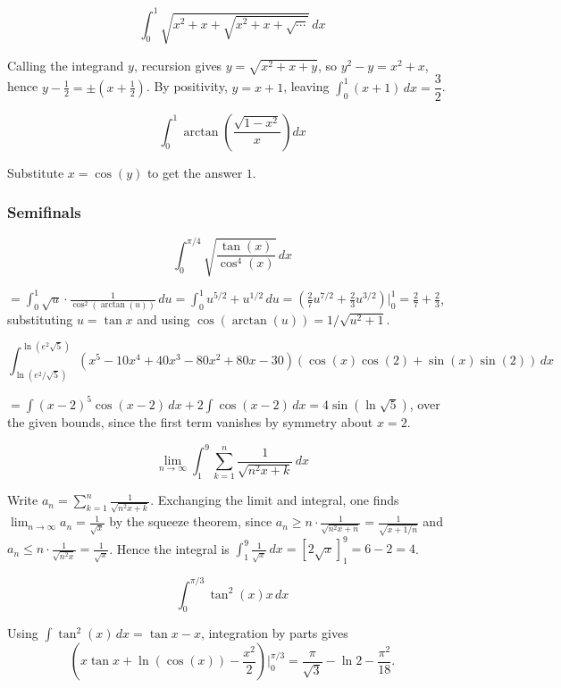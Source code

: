\begin{questions}
\question \[ \int_0^1 \sqrt{x^2+x+\sqrt{x^2+x+\sqrt{\cdots}}}\, dx \]
\begin{solution}
Calling the integrand $y$, recursion gives $y=\sqrt{x^2+x+y}$, so $y^2-y=x^2+x$, hence $y-\tfrac12=\pm(x+\tfrac12)$. By positivity, $y=x+1$, leaving $\int_0^1 (x+1)\, dx = \dfrac{3}{2}$.
\end{solution}

\question \[ \int_0^1 \arctan\left(\frac{\sqrt{1-x^2}}{x}\right) dx \]
\begin{solution}
Substitute $x=\cos(y)$ to get the answer $1$.
\end{solution}

\end{questions}

\subsubsection*{Semifinals}
\begin{questions}

\question \[ \int_0^{\pi/4} \sqrt{\frac{\tan(x)}{\cos^4(x)}}\, dx \]
\begin{solution}
$= \displaystyle\int_0^1 \sqrt{u}\cdot\frac{1}{\cos^2(\arctan(u))}\, du = \int_0^1 u^{5/2}+u^{1/2}\, du = \left(\frac{2}{7}u^{7/2}+\frac{2}{3}u^{3/2}\right)\Big|_0^1 = \frac{2}{7}+\frac{2}{3}$,
substituting $u=\tan x$ and using $\cos(\arctan(u)) = 1/\sqrt{u^2+1}$.
\end{solution}

\question \[ \int_{\ln(e^2/\sqrt5)}^{\ln(e^2\sqrt5)} \left(x^5-10x^4+40x^3-80x^2+80x-30\right)\left(\cos(x)\cos(2)+\sin(x)\sin(2)\right)\, dx \]
\begin{solution}
$= \displaystyle\int (x-2)^5\cos(x-2)\, dx + 2\int \cos(x-2)\, dx = 4\sin(\ln\sqrt5)$, over the given bounds, since the first term vanishes by symmetry about $x=2$.
\end{solution}

\question \[ \lim_{n\to\infty} \int_1^9 \sum_{k=1}^n \frac{1}{\sqrt{n^2x+k}}\, dx \]
\begin{solution}
Write $a_n=\sum_{k=1}^n \tfrac{1}{\sqrt{n^2x+k}}$. Exchanging the limit and integral, one finds $\lim_{n\to\infty} a_n = \tfrac{1}{\sqrt x}$ by the squeeze theorem, since $a_n\ge n\cdot\tfrac{1}{\sqrt{n^2x+n}}=\tfrac{1}{\sqrt{x+1/n}}$ and $a_n\le n\cdot\tfrac{1}{\sqrt{n^2x}}=\tfrac{1}{\sqrt x}$. Hence the integral is $\int_1^9 \tfrac{1}{\sqrt x}\, dx = [2\sqrt x]_1^9 = 6-2=4$.
\end{solution}

\question \[ \int_0^{\pi/3} \tan^2(x)x\, dx \]
\begin{solution}
Using $\int \tan^2(x)\, dx = \tan x - x$, integration by parts gives
\[ \left(x\tan x + \ln(\cos(x)) - \frac{x^2}{2}\right)\Big|_0^{\pi/3} = \frac{\pi}{\sqrt3} - \ln 2 - \frac{\pi^2}{18}. \]
\end{solution}

\end{questions}

